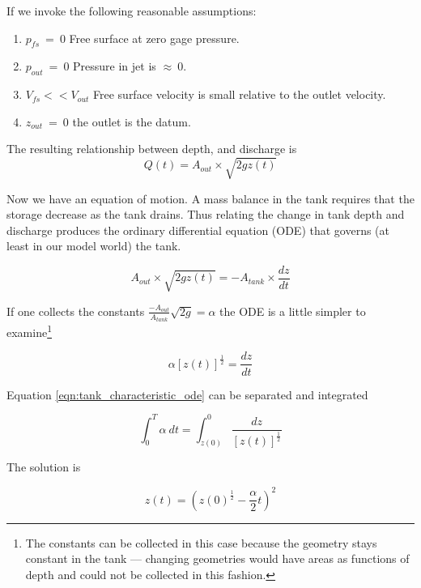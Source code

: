 \documentclass[12pt]{article}
\begin{document}
If we invoke the following reasonable assumptions:
\begin{enumerate}
\item $p_{fs}~=~0$ Free surface at zero gage pressure.
\item $p_{out}~=~0$ Pressure in jet is $\approx~0$.
\item $V_{fs} << V_{out}$ Free surface velocity is small relative to the outlet velocity.
\item $z_{out}~=~0$ the outlet is the datum.
\end{enumerate}

The resulting relationship between depth, and discharge is
\begin{equation}
Q(t)=A_{out} \times \sqrt{2gz(t)}
\label{eqn:tank_discharge}
\end{equation}

Now we have an equation of motion.  A mass balance in the tank requires that the storage decrease as the tank drains. Thus relating the change in tank depth and discharge produces the ordinary differential equation (ODE) that governs (at least in our model world) the tank.

\begin{equation}
A_{out} \times \sqrt{2gz(t)}=-A_{tank} \times \frac{d z}{d t}
\label{eqn:tank_ode}
\end{equation}

If one collects the constants $\frac{-A_{out}}{A_{tank}}\sqrt{2g} = \alpha$ the ODE is a little simpler to examine\footnote{The constants can be collected in this case because the geometry stays constant in the tank --- changing geometries would have areas as functions of depth and could not be collected in this fashion.}

\begin{equation}
\alpha  [z(t)]^{\frac{1}{2}}=  \frac{d z}{d t}
\label{eqn:tank_characteristic_ode}
\end{equation}

Equation \ref{eqn:tank_characteristic_ode} can be separated and integrated

\begin{equation}
\int_0^T{\alpha~dt }= \int_{z(0)}^0{ \frac{d z}{ [z(t)]^{\frac{1}{2}}} }
\label{eqn:tank_characteristic_integrated}
\end{equation}

The solution is

\begin{equation}
z(t)=(z(0)^{\frac{1}{2}}-\frac{\alpha}{2}t)^2
\label{eqn:tank_characteristic_solution}
\end{equation}
\end{document}

